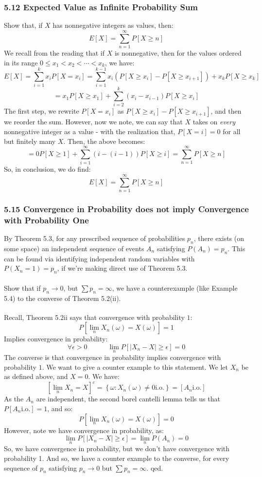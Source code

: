 \documentclass[12pt,a4paper]{article}
\newcommand{\1}[1]{\mathbbm{1}\left\{ #1 \right\}}
\newcommand{\io}{\text{i.o.}}
\begin{document}
\subsubsection{5.12 Expected Value as Infinite Probability Sum} Show that, if $X$ has nonnegative integers as values, then:
$$
	E[X] = \sum_{n=1}^\infty P[X \geq n]
$$
We recall from the reading that if $X$ is nonnegative, then for the values ordered in its range $0 \leq x_1 < x_2 < \cdots < x_k$, we have:
$$
	E[X] = \sum_{i=1}^k x_i P[X = x_i] =
	\sum_{i=1}^{k-1} x_i\left(P[X \geq x_i] - P[X \geq x_{i+1}]\right) + x_k P[X \geq x_k]
$$
$$
	= x_1P[X \geq x_1] + \sum_{i=2}^k (x_i - x_{i-1}) P[X \geq x_i]
$$
The first step, we rewrite $P[X = x_i]$ as $P[X \geq x_i] - P[X \geq x_{i+1}]$, and then we reorder the sum. However, now we note, we can say that $X$ takes on \textit{every} nonnegative integer as a value - with the realization that, $P[X = i] = 0$ for all but finitely many $X$. Then, the above becomes:
$$
	= 0 P[X \geq 1] + \sum_{i=1}^\infty (i - (i - 1)) P[X \geq i] =
	\sum_{n=1}^\infty P[X \geq n]
$$
So, in conclusion, we do find:
$$
	E[X] = \sum_{n=1}^\infty P[X \geq n]
$$

\subsubsection{5.15 Convergence in Probability does not imply Convergence with Probability One} By Theorem 5.3, for any prescribed sequence of probabilities $p_n$, there exists (on some space) an independent sequence of events $A_n$ satisfying $P(A_n) = p_n$. This can be found via identifying independent random variables with $P(X_n = 1) = p_n$, if we're making direct use of Theorem 5.3.
\\\\
Show that if $p_n \to 0$, but $\sum p_n = \infty$, we have a counterexample (like Example 5.4) to the converse of Theorem 5.2(ii).
\\\\
Recall, Theorem 5.2ii says that convergence with probability $1$:
$$
	P\left[\lim_n X_n(\omega) = X(\omega)\right] = 1
$$
Implies convergence in probability:
$$
	\forall \epsilon > 0 \quad\quad\quad \lim_n P\left[|X_n - X| \geq \epsilon\right] = 0
$$
The converse is that convergence in probability implies convergence with probability $1$. We want to give a counter example to this statement. We let $X_n$ be as defined above, and $X = 0$. We have:
$$
	\left[\lim_n X_n = X\right]^c = \left\{\omega: X_n(\omega) \neq 0 \io\right\} = [A_n \io]
$$
As the $A_n$ are independent, the second borel cantelli lemma tells us that $P[A_n \io] = 1$, and so:
$$
	P\left[\lim_n X_n(\omega) = X(\omega)\right] = 0
$$
However, note we have convergence in probability, as:
$$
	\lim_n P[|X_n - X| \geq \epsilon] = \lim_n P(A_n) = 0
$$
So, we have convergence in probability, but we don't have convergence with probability 1. And so, we have a counter example to the converse, for every sequence of $p_n$ satisfying $p_n \to 0$ but $\sum p_n = \infty$. qed.
\end{document}
